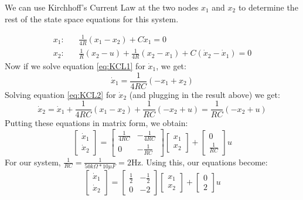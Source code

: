 \documentclass[11pt]{article}
\begin{document}
We can use Kirchhoff's Current Law at the two nodes $x_1$ and $x_2$ to determine the rest of the state space equations for this system.

\begin{align}
x_1:&~~~~ \frac{1}{4R}(x_1-x_2) + C\dot{x}_1 = 0 \label{eq:KCL1} \\ 
x_2:&~~~~ \frac{1}{R}(x_2 - u) + \frac{1}{4R}(x_2-x_1) + C(\dot{x}_2-\dot{x}_1) = 0 \label{eq:KCL2}
\end{align}
%
Now if we solve equation \ref{eq:KCL1} for $\dot{x}_1$, we get:
\begin{equation}
\dot{x}_1 = \frac{1}{4RC}(-x_1+x_2)
\end{equation}
%
Solving equation \ref{eq:KCL2} for $\dot{x}_2$ (and plugging in the result above) we get:
%
\begin{equation}
\dot{x}_2 = \dot{x}_1+\frac{1}{4RC}(x_1-x_2)+\frac{1}{RC}(-x_2+u) =\frac{1}{RC}(-x_2+u)
\end{equation}
%
Putting these equations in matrix form, we obtain:
%
\begin{equation}
\begin{bmatrix}
\dot{x}_1 \\ \dot{x}_2
\end{bmatrix} = 
\begin{bmatrix}
\frac{1}{4RC} & -\frac{1}{4RC} \\
0    & -\frac{1}{RC}
\end{bmatrix}
\begin{bmatrix}
x_1 \\ x_2
\end{bmatrix} + 
\begin{bmatrix}
0 \\ \frac{1}{RC}
\end{bmatrix} u
\end{equation}
%
For our system, $\frac{1}{RC} = \frac{1}{50k\Omega*10\mu F} = 2\mathrm{Hz}$.
Using this, our equations become:
%
\begin{equation}
\begin{bmatrix}
\dot{x}_1 \\ \dot{x}_2
\end{bmatrix} = 
\begin{bmatrix}
\frac{1}{2} & -\frac{1}{2} \\
0    & -2
\end{bmatrix}
\begin{bmatrix}
x_1 \\ x_2
\end{bmatrix} + 
\begin{bmatrix}
0 \\ 2
\end{bmatrix} u
\end{equation}
\end{document}

